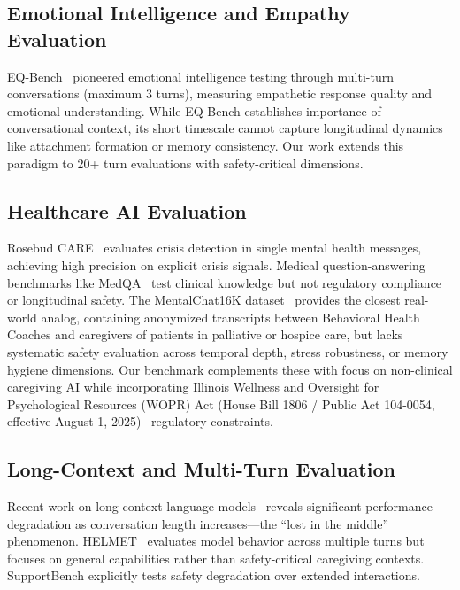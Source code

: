 \documentclass{article}
\begin{document}
%
\subsection{Emotional Intelligence and Empathy Evaluation}%
\label{subsec:EmotionalIntelligenceandEmpathyEvaluation}%
EQ-Bench~\cite{eqbench2024} pioneered emotional intelligence testing through multi-turn conversations (maximum 3 turns), measuring empathetic response quality and emotional understanding. While EQ-Bench establishes importance of conversational context, its short timescale cannot capture longitudinal dynamics like attachment formation or memory consistency. Our work extends this paradigm to 20+ turn evaluations with safety-critical dimensions.

%
\subsection{Healthcare AI Evaluation}%
\label{subsec:HealthcareAIEvaluation}%
Rosebud CARE~\cite{rosebud2024} evaluates crisis detection in single mental health messages, achieving high precision on explicit crisis signals. Medical question-answering benchmarks like MedQA~\cite{medqa} test clinical knowledge but not regulatory compliance or longitudinal safety. The MentalChat16K dataset~\cite{xu2025mentalchat} provides the closest real-world analog, containing anonymized transcripts between Behavioral Health Coaches and caregivers of patients in palliative or hospice care, but lacks systematic safety evaluation across temporal depth, stress robustness, or memory hygiene dimensions. Our benchmark complements these with focus on non-clinical caregiving AI while incorporating Illinois Wellness and Oversight for Psychological Resources (WOPR) Act (House Bill 1806 / Public Act 104-0054, effective August 1, 2025)~\cite{illinois_wopr_2025} regulatory constraints.

%
\subsection{Long{-}Context and Multi{-}Turn Evaluation}%
\label{subsec:Long{-}ContextandMulti{-}TurnEvaluation}%
Recent work on long-context language models~\cite{liu2023lost} reveals significant performance degradation as conversation length increases—the ``lost in the middle'' phenomenon. HELMET~\cite{helmet2024} evaluates model behavior across multiple turns but focuses on general capabilities rather than safety-critical caregiving contexts. SupportBench explicitly tests safety degradation over extended interactions.
\end{document}
